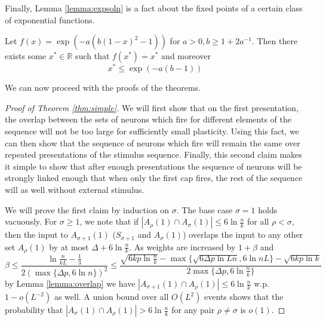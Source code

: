 \documentclass[12pt,nosubfloats]{alt2024} %
\newcommand{\R}{\mathbb{R}}
\newcommand{\1}{\mathbbm{1}}
\begin{document}
Finally, Lemma \ref{lemma:expsoln} is a fact about the fixed points of a certain class of exponential functions.

\begin{lemma} \label{lemma:expsoln}
Let $f(x) = \exp(-a(b(1-x)^2-1))$ for $a > 0, b \ge 1 + 2a^{-1}$. Then there exists some $x^* \in \R$ such that $f(x^*) = x^*$ and moreover
\[x^* \le \exp(-a(b-1))\]
\end{lemma}

We can now proceed with the proofs of the theorems.

\begin{proof}[Proof of Theorem \ref{thm:simple}]
We will first show that on the first presentation, the overlap between the sets of neurons which fire for different elements of the sequence will not be too large for sufficiently small plasticity. Using this fact, we can then show that the sequence of neurons which fire will remain the same over repeated presentations of the stimulus sequence. Finally, this second claim makes it simple to show that after enough presentations the sequence of neurons will be strongly linked enough that when only the first cap fires, the rest of the sequence will as well without external stimulus.

We will prove the first claim by induction on $\sigma$. The base case $\sigma = 1$ holds vacuously. For $\sigma \ge 1$, we note that if $|A_{\rho}(1) \cap A_{\sigma}(1)| \le 6 \ln \frac{n}{k}$ for all $\rho < \sigma$, then the input to $A_{\sigma+1}(1)$ ($S_{\sigma+1}$ and $A_\sigma(1)$) overlaps the input to any other set $A_{\rho}(1)$ by at most $\Delta + 6 \ln \frac{n}{k}$. As weights are increased by $1 + \beta$ and
\[\beta \le \frac{\ln \frac{n}{kL} - \frac{1}{3}}{2 (\max \{\Delta p, 6 \ln n\})^2 } \le \frac{\sqrt{6kp \ln \frac{n}{k}} - \max\{\sqrt{6 \Delta p \ln Ln}, 6\ln nL\} - \sqrt{6kp \ln k}}{2\max \{\Delta p, 6 \ln \frac{n}{k}\} }\]
by Lemma \ref{lemma:overlap} we have $|A_{\sigma+1}(1) \cap A_{\rho}(1)| \le 6\ln \frac{n}{k}$ w.p. $1 - o(L^{-2})$ as well. A union bound over all $O(L^2) $ events shows that the probability that $|A_{\sigma}(1) \cap A_{\rho}(1)| > 6\ln \frac{n}{k}$ for any pair $\rho \neq \sigma$ is $o(1)$.


\end{proof}
\end{document}
